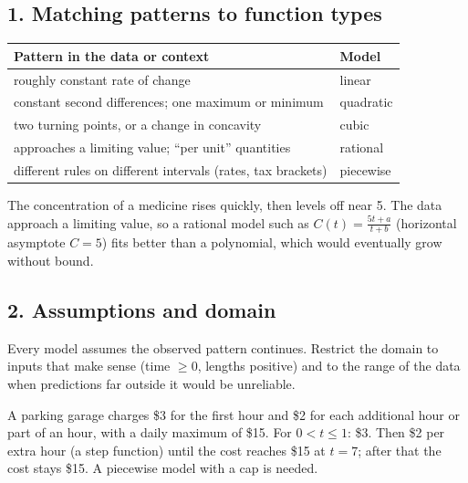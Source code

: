 \subsection*{1. Matching patterns to function types}
\begin{center}\small
\begin{tabular}{@{}ll@{}}\toprule
Pattern in the data or context & Model\\\midrule
roughly constant rate of change & linear\\
constant second differences; one maximum or minimum & quadratic\\
two turning points, or a change in concavity & cubic\\
approaches a limiting value; ``per unit'' quantities & rational\\
different rules on different intervals (rates, tax brackets) & piecewise\\\bottomrule
\end{tabular}
\end{center}

\begin{example}
\begin{center}
\end{center}
The concentration of a medicine rises quickly, then levels off near 5. \sol The data approach a limiting value, so a rational model such as $C(t)=\frac{5t+a}{t+b}$ (horizontal asymptote $C=5$) fits better than a polynomial, which would eventually grow without bound.
\end{example}

\subsection*{2. Assumptions and domain}
Every model assumes the observed pattern continues. Restrict the domain to inputs that make sense (time $\ge0$, lengths positive) and to the range of the data when predictions far outside it would be unreliable.

\begin{example}
A parking garage charges \$3 for the first hour and \$2 for each additional hour or part of an hour, with a daily maximum of \$15.
\sol For $0<t\le1$: \$3. Then \$2 per extra hour (a step function) until the cost reaches \$15 at $t=7$; after that the cost stays \$15. A piecewise model with a cap is needed.
\end{example}

